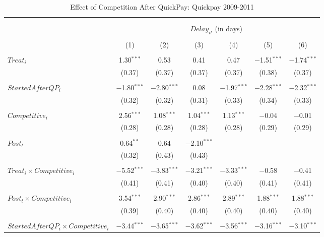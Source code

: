 \documentclass[
]{article}
\begin{document}
\begin{table}[H] \centering 
  \caption{Effect of Competition After QuickPay: Quickpay 2009-2011} 
  \label{} 
\small 
\begin{tabular}{@{\extracolsep{-3pt}}lcccccc} 
\\[-1.8ex]\hline 
\hline \\[-1.8ex] 
\\[-1.8ex] & \multicolumn{6}{c}{$Delay_{it}$ (in days)} \\ 
\\[-1.8ex] & (1) & (2) & (3) & (4) & (5) & (6)\\ 
\hline \\[-1.8ex] 
 $Treat_i$ & 1.30$^{***}$ & 0.53 & 0.41 & 0.47 & $-$1.51$^{***}$ & $-$1.74$^{***}$ \\ 
  & (0.37) & (0.37) & (0.37) & (0.37) & (0.38) & (0.37) \\ 
  & & & & & & \\ 
 $StartedAfterQP_i$ & $-$1.80$^{***}$ & $-$2.80$^{***}$ & 0.08 & $-$1.97$^{***}$ & $-$2.28$^{***}$ & $-$2.32$^{***}$ \\ 
  & (0.32) & (0.32) & (0.31) & (0.33) & (0.34) & (0.33) \\ 
  & & & & & & \\ 
 $Competitive_i$ & 2.56$^{***}$ & 1.08$^{***}$ & 1.04$^{***}$ & 1.13$^{***}$ & $-$0.04 & $-$0.01 \\ 
  & (0.28) & (0.28) & (0.28) & (0.28) & (0.29) & (0.29) \\ 
  & & & & & & \\ 
 $Post_t$ & 0.64$^{**}$ & 0.64 & $-$2.10$^{***}$ &  &  &  \\ 
  & (0.32) & (0.43) & (0.43) &  &  &  \\ 
  & & & & & & \\ 
 $Treat_i \times Competitive_i$ & $-$5.52$^{***}$ & $-$3.83$^{***}$ & $-$3.21$^{***}$ & $-$3.33$^{***}$ & $-$0.58 & $-$0.41 \\ 
  & (0.41) & (0.41) & (0.40) & (0.40) & (0.41) & (0.41) \\ 
  & & & & & & \\ 
 $Post_t \times Competitive_i$ & 3.54$^{***}$ & 2.90$^{***}$ & 2.86$^{***}$ & 2.89$^{***}$ & 1.88$^{***}$ & 1.88$^{***}$ \\ 
  & (0.39) & (0.40) & (0.40) & (0.40) & (0.40) & (0.40) \\ 
  & & & & & & \\ 
 $StartedAfterQP_i \times Competitive_i$ & $-$3.44$^{***}$ & $-$3.65$^{***}$ & $-$3.62$^{***}$ & $-$3.56$^{***}$ & $-$3.16$^{***}$ & $-$3.10$^{***}$ \\ 

\end{tabular}
\end{table}
\end{document}

